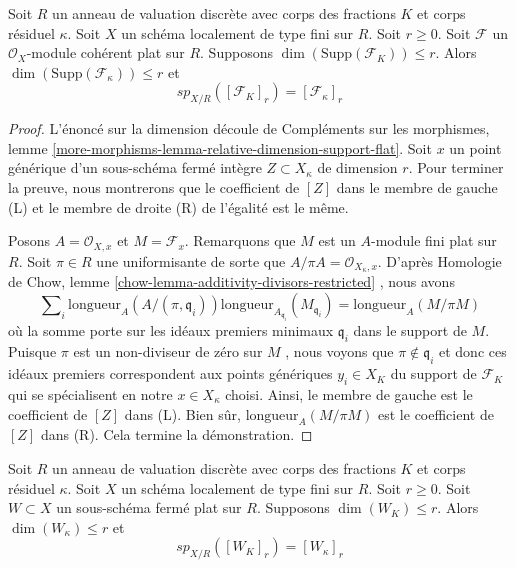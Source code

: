 \begin{lemma} 
\label{lemma-specialization-module} 
Soit  $R$  un anneau de valuation discrète avec corps des fractions $K$  et corps résiduel  
$\kappa$. Soit  $X$  un schéma localement de type fini sur  $R$. Soit  $r \geq 0$. 
Soit  $\mathcal{F}$  un $\mathcal{O}_X$-module cohérent plat sur  $R$. Supposons  
$\dim(\text{Supp}(\mathcal{F}_K)) \leq r$. Alors 
$\dim(\text{Supp}(\mathcal{F}_\kappa)) \leq r$  et 
$$
sp_{X/R}([\mathcal{F}_K]_r) = [\mathcal{F}_\kappa]_r
$$
\end{lemma} 

\begin{proof} 
L'énoncé sur la dimension découle de Compléments sur les morphismes, lemme 
\ref{more-morphisms-lemma-relative-dimension-support-flat}. 
Soit  $x$  un point générique d'un sous-schéma fermé intègre  
$Z \subset X_\kappa$ de dimension  $r$. Pour terminer la preuve,
 nous montrerons que le coefficient de $[Z]$
 dans le membre de gauche (L) et le membre de droite (R) de l’égalité est le même. 

\medskip\noindent
 Posons $A = \mathcal{O}_{X, x}$ et $M = \mathcal{F}_x$.
 Remarquons que  $M$  est un $A$-module fini plat sur  $R$. 
Soit  $\pi \in R$  une uniformisante de sorte que  
$A/\pi A = \mathcal{O}_{X_\kappa, x}$.
 D'après Homologie de Chow, lemme \ref{chow-lemma-additivity-divisors-restricted} , nous
 avons 
$$
\sum\nolimits_i \text{longueur}_A(A/(\pi, \mathfrak q_i))
\text{longueur}_{A_{\mathfrak q_i}}(M_{\mathfrak q_i}) =
\text{longueur}_A(M/\pi M)
$$
 où la somme porte sur les idéaux premiers minimaux  
$\mathfrak q_i$  dans le support de $M$. 
Puisque  $\pi$  est un non-diviseur de zéro sur  $M$ , nous voyons
 que  $\pi \not \in \mathfrak q_i$  et donc ces
 idéaux premiers correspondent aux points génériques  $y_i \in X_K$  du 
support de  $\mathcal{F}_K$  qui se spécialisent en notre $x \in X_\kappa$ 
choisi. Ainsi, le membre de gauche est le coefficient de  $[Z]$
  dans (L). Bien sûr,  $\text{longueur}_A(M/\pi M)$  est le coefficient 
de  $[Z]$  dans (R). Cela termine la démonstration. 
\end{proof} 

\begin{lemma} 
\label{lemma-specialization-closed} 
Soit  $R$  un anneau de valuation discrète avec corps des fractions $K$  et corps résiduel  
$\kappa$. Soit  $X$  un schéma localement de type fini sur  $R$. Soit  $r \geq 0$. 
Soit  $W \subset X$  un sous-schéma fermé plat sur  $R$. Supposons  
$\dim(W_K) \leq r$. Alors $\dim(W_\kappa) \leq r$  et 
$$
sp_{X/R}([W_K]_r) = [W_\kappa]_r
$$
\end{lemma} 

